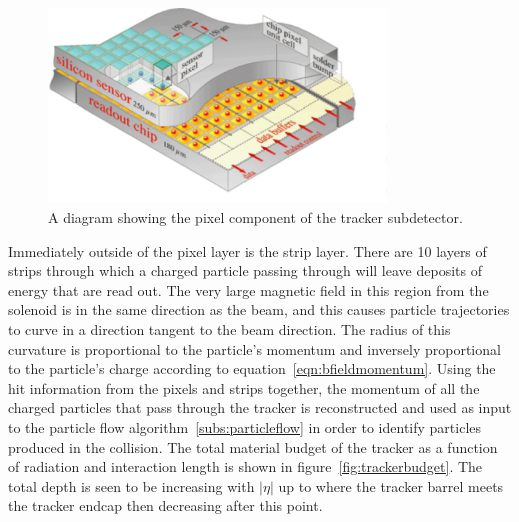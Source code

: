 \begin{figure}[!htb]
  \begin{center}
    \includegraphics[width=0.8\textwidth]{cms/figs/Pixelement.pdf}
    \caption{
      \label{fig:pixels}
      A diagram showing the pixel component of the tracker subdetector.
    }
  \end{center}
\end{figure}

Immediately outside of the pixel layer is the strip layer.
There are 10 layers of strips through which a charged particle passing through will leave deposits of energy that are read out.
The very large magnetic field in this region from the solenoid is in the same direction as the beam,
and this causes particle trajectories to curve in a direction tangent to the beam direction. 
The radius of this curvature is proportional to the particle's momentum and inversely proportional to the particle's charge according to equation~\ref{eqn:bfieldmomentum}.
Using the hit information from the pixels and strips together,
the momentum of all the charged particles that pass through the tracker is reconstructed and
used as input to the particle flow algorithm~\ref{subs:particleflow} in order to identify particles produced in the collision.
The total material budget of the tracker as a function of radiation and interaction length is shown in figure~\ref{fig:trackerbudget}.
The total depth is seen to be increasing with $|\eta|$ up to where the tracker barrel meets the tracker endcap then decreasing after this point.


